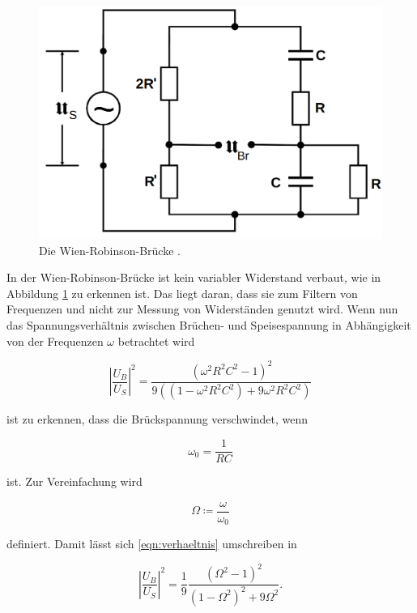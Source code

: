 \begin{figure}
    \centering
    \includegraphics[scale=0.25]{content/Wien-Robinson-Bruecke.png}
    \caption{Die Wien-Robinson-Brücke \cite[S. 223]{anleitung}.}
    \label{fig:wien}
\end{figure}

In der Wien-Robinson-Brücke ist kein variabler Widerstand verbaut, wie in Abbildung \ref{fig:wien}
zu erkennen ist.
Das liegt daran, dass sie zum Filtern von Frequenzen und nicht zur Messung von Widerständen genutzt wird.
Wenn nun das Spannungsverhältnis zwischen Brüchen- und Speisespannung in Abhängigkeit von der Frequenzen $\omega$ betrachtet wird 

\begin{equation}
    \left | \frac{U_B}{U_S} \right |^2 = \frac{(\omega^2R^2C^2-1)^2}{9((1-\omega^2R^2C^2) + 9 \omega^2 R^2 C^2)}
    \label{eqn:verhaeltnis}
\end{equation}

ist zu erkennen, dass die Brückspannung verschwindet, wenn 

\begin{equation}
    \omega_0 = \frac{1}{RC}
    \label{eqn:wien_rc}
\end{equation}

ist. Zur Vereinfachung wird 

\begin{equation*}
    \Omega \coloneq \frac{\omega}{\omega_0}
\end{equation*}

definiert. Damit lässt sich \eqref{eqn:verhaeltnis} umschreiben in

\begin{equation}
    \left | \frac{U_B}{U_S} \right |^2 = \frac{1}{9} \frac{(\Omega^2 -1)^2}{(1-\Omega^2)^2 + 9\Omega^2}.
    \label{eqn:wien_verh}
\end{equation}


